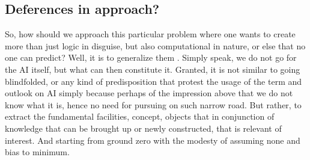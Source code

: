 \subsection{Deferences in approach?}
So, how should we approach this particular problem where one wants to create more than just logic in disguise, but also computational in nature, or else that no one can predict? Well, it is to generalize them . Simply speak, we do not go for the AI itself, but what can then constitute it. Granted, it is not similar to going blindfolded, or any kind of predisposition that protest the usage of the term and outlook on AI simply because perhaps of the impression above that we do not know what it is, hence no need for pursuing on such narrow road. But rather, to extract the fundamental facilities, concept, objects that in conjunction of knowledge that can be brought up or newly constructed, that is relevant of interest. And starting from ground zero with the modesty of assuming none and bias to minimum. 

